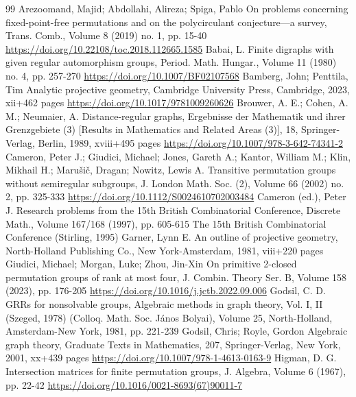 \begin{thebibliography}{99}
 Arezoomand, Majid; Abdollahi, Alireza; Spiga, Pablo On problems concerning fixed-point-free permutations and on the polycirculant conjecture—a survey, Trans. Comb., Volume 8 (2019) no. 1, pp. 15-40 \url{https://doi.org/10.22108/toc.2018.112665.1585}
 Babai, L. Finite digraphs with given regular automorphism groups, Period. Math. Hungar., Volume 11 (1980) no. 4, pp. 257-270 \url{https://doi.org/10.1007/BF02107568}
 Bamberg, John; Penttila, Tim Analytic projective geometry, Cambridge University Press, Cambridge, 2023, xii+462 pages \url{https://doi.org/10.1017/9781009260626}
 Brouwer, A. E.; Cohen, A. M.; Neumaier, A. Distance-regular graphs, Ergebnisse der Mathematik und ihrer Grenzgebiete (3) [Results in Mathematics and Related Areas (3)], 18, Springer-Verlag, Berlin, 1989, xviii+495 pages \url{https://doi.org/10.1007/978-3-642-74341-2}
 Cameron, Peter J.; Giudici, Michael; Jones, Gareth A.; Kantor, William M.; Klin, Mikhail H.; Marušič, Dragan; Nowitz, Lewis A. Transitive permutation groups without semiregular subgroups, J. London Math. Soc. (2), Volume 66 (2002) no. 2, pp. 325-333 \url{https://doi.org/10.1112/S0024610702003484}
 Cameron (ed.), Peter J. Research problems from the 15th British Combinatorial Conference, Discrete Math., Volume 167/168 (1997), pp. 605-615 The 15th British Combinatorial Conference (Stirling, 1995)
 Garner, Lynn E. An outline of projective geometry, North-Holland Publishing Co., New York-Amsterdam, 1981, viii+220 pages
 Giudici, Michael; Morgan, Luke; Zhou, Jin-Xin On primitive 2-closed permutation groups of rank at most four, J. Combin. Theory Ser. B, Volume 158 (2023), pp. 176-205 \url{https://doi.org/10.1016/j.jctb.2022.09.006}
 Godsil, C. D. GRRs for nonsolvable groups, Algebraic methods in graph theory, Vol. I, II (Szeged, 1978) (Colloq. Math. Soc. János Bolyai), Volume 25, North-Holland, Amsterdam-New York, 1981, pp. 221-239
 Godsil, Chris; Royle, Gordon Algebraic graph theory, Graduate Texts in Mathematics, 207, Springer-Verlag, New York, 2001, xx+439 pages \url{https://doi.org/10.1007/978-1-4613-0163-9}
 Higman, D. G. Intersection matrices for finite permutation groups, J. Algebra, Volume 6 (1967), pp. 22-42 \url{https://doi.org/10.1016/0021-8693(67)90011-7}

\end{thebibliography}
